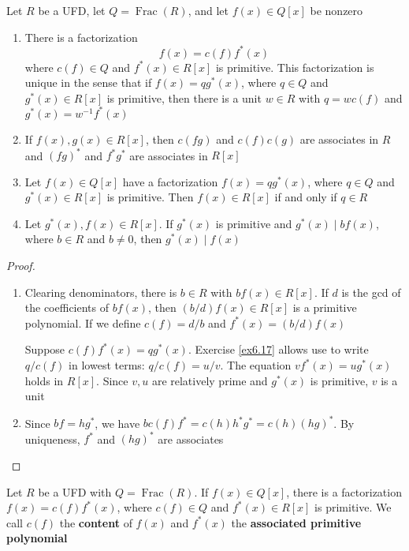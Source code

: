 \documentclass[11pt]{article}
\DeclareMathOperator{\Frac}{Frac}
\begin{document}
\begin{lemma}[]
\label{lemma6.24}
Let \(R\) be a UFD, let \(Q=\Frac(R)\), and let \(f(x)\in Q[x]\) be nonzero
\begin{enumerate}
\item There is a factorization
\begin{equation*}
f(x)=c(f)f^*(x)
\end{equation*}
where \(c(f)\in Q\) and \(f^*(x)\in R[x]\) is primitive. This
factorization is unique in the sense that if \(f(x)=qg^*(x)\), where
\(q\in Q\) and \(g^*(x)\in R[x]\) is primitive, then there is a unit 
\(w\in R\) with \(q=wc(f)\) and \(g^*(x)=w^{-1}f^*(x)\)
\item If \(f(x),g(x)\in R[x]\), then \(c(fg)\) and \(c(f)c(g)\) are associates
in \(R\) and \((fg)^*\) and \(f^*g^*\) are associates in \(R[x]\)
\item Let \(f(x)\in Q[x]\) have a factorization \(f(x)=qg^*(x)\), where 
\(q\in Q\) and \(g^*(x)\in R[x]\) is primitive. Then \(f(x)\in R[x]\) if
and only if \(q\in R\)
\item Let \(g^*(x),f(x)\in R[x]\). If \(g^*(x)\) is primitive and 
\(g^*(x)\mid b f(x)\), where \(b\in R\) and \(b\neq0\), then 
\(g^*(x)\mid f(x)\)
\end{enumerate}
\end{lemma}

\begin{proof}
\begin{enumerate}
\item Clearing denominators, there is \(b\in R\) with \(bf(x)\in R[x]\). If
\(d\) is the gcd of the coefficients of \(bf(x)\), then \((b/d)f(x)\in
      R[x]\) is a primitive polynomial. If we define \(c(f)=d/b\) and 
\(f^*(x)=(b/d)f(x)\)

Suppose \(c(f)f^*(x)=qg^*(x)\). Exercise \ref{ex6.17} allows use to write
\(q/c(f)\) in lowest terms: \(q/c(f)=u/v\). The equation 
\(vf^*(x)=ug^*(x)\) holds in \(R[x]\). Since \(v,u\) are relatively prime
and \(g^*(x)\) is primitive, \(v\) is a unit

\setcounter{enumi}{3}
\item Since \(bf=hg^*\), we have \(bc(f)f^*=c(h)h^*g^*=c(h)(hg)^*\). By
uniqueness, \(f^*\) and \((hg)^*\) are associates
\end{enumerate}
\end{proof}

\begin{definition}[]
Let \(R\) be a UFD with \(Q=\Frac(R)\). If \(f(x)\in Q[x]\), there is a
factorization \(f(x)=c(f)f^*(x)\), where \(c(f)\in Q\) and 
\(f^*(x)\in R[x]\) is primitive. We call \(c(f)\) the \textbf{content} of \(f(x)\) and
\(f^*(x)\) the \textbf{associated primitive polynomial}
\end{definition}
\end{document}
